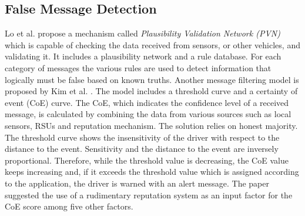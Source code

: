 \documentclass[journal]{IEEEtran}
\begin{document}
\subsection{False Message Detection}
\label{sec:RV:FalseMsgDetection}
Lo et al. \cite{c:IllusionAttack} propose a mechanism called \textit{Plausibility Validation Network (PVN)} which is capable of checking the data received from sensors, or other vehicles, and validating it. It includes a plausibility network and a rule database. For each category of messages the various rules are used to detect information that logically must be false based on known truths.
Another  message filtering model is proposed by Kim et al. \cite{c:messagefilterCoE}. The model includes a threshold curve and a certainty of event (CoE) curve. The CoE, which indicates the confidence level of a received message, is calculated by combining the data from various sources such as local sensors, RSUs and reputation mechanism. The solution relies on honest majority. The threshold curve shows the insensitivity of the driver with respect to the distance to the event. Sensitivity and the distance to the event are inversely proportional. Therefore, while the threshold value is decreasing, the CoE value keeps increasing and, if it exceeds the threshold value which is assigned according to the application, the driver is warned with an alert message. The paper suggested the use of a rudimentary reputation system as an input factor for the CoE score among five other factors.
\end{document}
